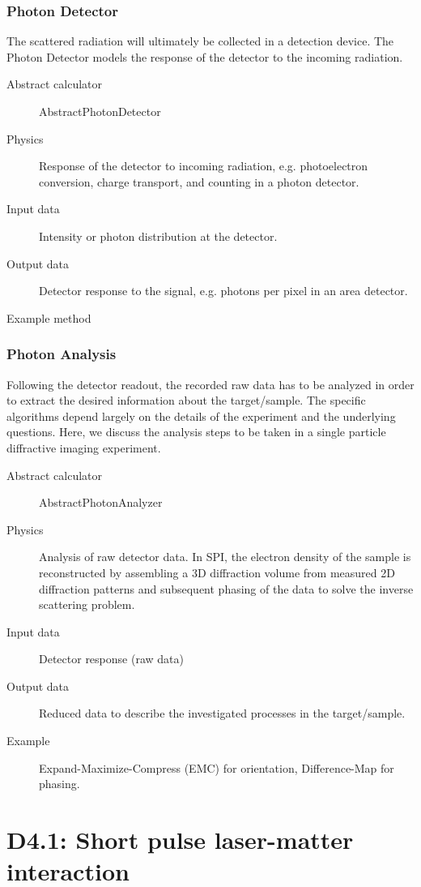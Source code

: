 \documentclass[a4paper]{article}
\begin{document}
\subsubsection{Photon Detector}
The scattered radiation will ultimately  be collected in a detection device. The Photon Detector models the response of the detector to the incoming
radiation.
\begin{description}
  \item[Abstract calculator] AbstractPhotonDetector
  \item[Physics] Response of the detector to incoming radiation, e.g. photoelectron conversion, charge transport, and counting in a photon detector.
  \item[Input data] Intensity or photon distribution at the detector.
  \item[Output data] Detector response to the signal, e.g. photons per pixel in an area detector.
  \item[Example method]
\end{description}

\subsubsection{Photon Analysis}
Following the detector readout, the recorded raw data has to be analyzed in order to extract the desired information about the target/sample. The
specific algorithms depend largely on the details of the experiment and the underlying questions. Here, we discuss the analysis steps to be taken
in a single particle diffractive imaging experiment.
\begin{description}
  \item[Abstract calculator] AbstractPhotonAnalyzer
  \item[Physics]  Analysis of raw detector data. In SPI, the electron density of the sample is reconstructed by assembling a 3D diffraction volume
    from measured 2D diffraction patterns and subsequent phasing of the data to solve the inverse scattering problem.
  \item[Input data] Detector response (raw data)
  \item[Output data] Reduced data to describe the investigated processes in the target/sample.
  \item[Example]  Expand-Maximize-Compress (EMC) for orientation, Difference-Map for phasing.
\end{description}



\section{D4.1: Short pulse laser-matter interaction\label{sec:short_pulse}}
\end{document}
